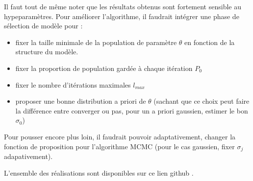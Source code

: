 \documentclass[french,12pt]{article}
\begin{document}
Il faut tout de même noter que les résultats obtenus sont fortement
sensible au hypeparamètres. Pour améliorer l'algorithme, il faudrait
intégrer une phase de sélection de modèle pour :

\begin{itemize}
    \item fixer la taille minimale de la population de paramètre $\theta$ en fonction
          de la structure du modèle.
    \item fixer la proportion de population gardée à chaque itération $P_0$
    \item fixer le nombre d'itérations maximales $l_{max}$
    \item proposer une bonne distribution a priori de $\theta$ \cite{Andrieu2003} (sachant que ce choix
          peut faire la différence entre converger ou pas, pour un a priori gaussien, estimer
          le bon $\sigma_0$)
\end{itemize}

Pour pousser encore plus loin, il faudrait pouvoir adaptativement, changer la fonction
de proposition pour l'algorithme MCMC \cite{Andrieu2003,Chiachio2014}(pour le cas gaussien, fixer $\sigma_j$ adapativement).

L'ensemble des réalisations sont disponibles sur ce lien github \cite{githubLink}.

\pagebreak


\end{document}
